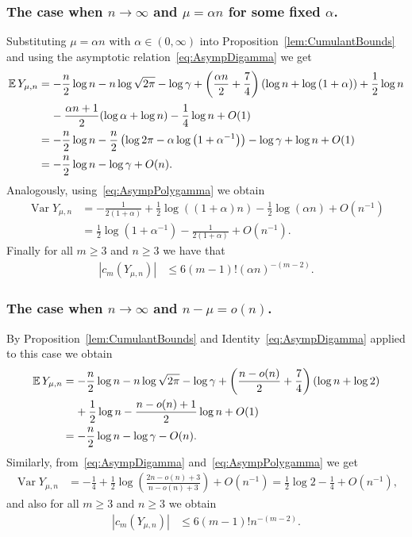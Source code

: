 \documentclass[10pt]{amsart}
\theoremstyle{definition}\newtheorem{defi}[theo]{Definition}\newtheorem{rema}[theo]{Remark}\newtheorem{exam}[theo]{Example}\newtheorem{exem}[theo]{Example}\newtheorem{nota}[theo]{Notation}
\newcommand{\EE}{\mathbb{E}\,}
\newcommand{\Var}{\mathop{\mathrm{Var}}\nolimits}
\begin{document}
\subsubsection{The case when $n\rightarrow \infty$ and $\mu=\alpha n$ for some fixed $\alpha$.}
Substituting $\mu=\alpha n$ with $\alpha\in(0,\infty)$ into Proposition~\ref{lem:CumulantBounds} and using the asymptotic relation~\eqref{eq:AsympDigamma} we get
\begin{align*}
\EE Y_{\mu,n}&=-\frac{n}{2}\log n-n\log\sqrt{2\pi}-\log\gamma +\left(\frac{\alpha n}{2}+\frac{7}{4}\right)(\log n + \log\left(1+\alpha\right))+\frac{1}{2}\log n\\[0.20em]
&\mkern20mu-\frac{\alpha n+1}{2}(\log\alpha +\log n)-\frac{1}{4}\log n+O(1)\\
&=-\frac{n}{2}\log n-\frac{n}{2}\left(\log 2\pi-\alpha\log\left(1+\alpha^{-1}\right)\right)-\log\gamma +\log n+O(1)\\
&= -\frac{n}{2}\log n-\log\gamma + O(n).
\end{align*}
Analogously, using~\eqref{eq:AsympPolygamma} we obtain
\begin{align*}
\Var Y_{\mu,n}&=-\frac{1}{2(1+\alpha)}+\frac12\log((1+\alpha)n)-\frac12\log(\alpha n)+O\left(n^{-1}\right)\\
&= \frac12\log\left(1+\alpha^{-1}\right)-\frac{1}{2(1+\alpha)}+O\left(n^{-1}\right).
\end{align*}
Finally for all $m\geq 3$ and $n\geq 3$ we have that
\begin{align*}
|c_m(Y_{\mu,n})|&\leq 6(m-1)!(\alpha n)^{-(m-2)}.
\end{align*}

\subsubsection{The case when $n\rightarrow \infty$ and $n-\mu = o(n)$.}
By Proposition~\ref{lem:CumulantBounds} and Identity~\eqref{eq:AsympDigamma} applied to this case we obtain
\begin{align*}
\EE Y_{\mu,n}&=-\frac{n}{2}\log n-n\log\sqrt{2\pi}-\log\gamma +\left(\frac{n-o(n)}{2}+\frac{7}{4}\right)(\log n+\log 2)\\
&\mkern20mu+\frac{1}{2}\log n-\frac{n-o(n)+1}{2}\log n+O(1)\\
&= -\frac{n}{2}\log n-\log\gamma - O(n).
\end{align*}
Similarly, from~\eqref{eq:AsympDigamma} and~\eqref{eq:AsympPolygamma} we get
\begin{align*}
\Var Y_{\mu,n}&=-\frac{1}{4}+\frac12\log\left(\frac{2n-o(n)+3}{n-o(n)+3 }\right)+O\left(n^{-1}\right)=\frac{1}{2}\log 2-\frac{1}{4}+O\left(n^{-1}\right),
\end{align*}
and also for all $m\geq 3$ and $n\geq 3$ we obtain
\begin{align*}
|c_m(Y_{\mu,n})|&\leq 6(m-1)!n^{-(m-2)}.
\end{align*}
\end{document}
